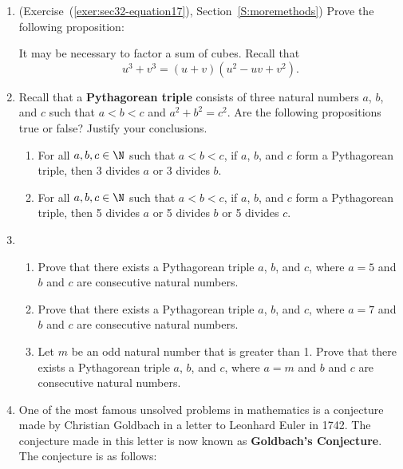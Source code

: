 \begin{enumerate}
\item (Exercise~(\ref{exer:sec32-equation17}), Section~\ref{S:moremethods})  Prove the following proposition:
\label{exer:sec32-equation}%
\hint It may be necessary to factor a sum  of cubes.  Recall that 
\[
u^3 + v^3 = \left( u + v \right) \left( u^2 - uv + v^2 \right).
\]



\item Recall that a \textbf{Pythagorean triple}
%
 consists of three natural numbers $a$, $b$, and $c$ such that 
$a < b < c$ and $a^2 + b^2 = c^2$.  Are the following propositions true or false?  Justify your conclusions.
\begin{enumerate}
\item For all $a, b, c \in \N$ such that $a < b < c$, if $a$, $b$, and $c$ form a Pythagorean triple, then 3 divides $a$ or 3 divides $b$.
\item For all $a, b, c \in \N$ such that $a < b < c$, if $a$, $b$, and $c$ form a Pythagorean triple, then 5 divides $a$ or 5 divides $b$ or 5 divides $c$.
\end{enumerate}

\item \begin{enumerate}
\item Prove that there exists a Pythagorean triple $a$, $b$, and $c$, where  $a = 5$ and $b$ and $c$ are consecutive natural numbers.

\item Prove that there exists a Pythagorean triple $a$, $b$, and $c$, where  $a = 7$ and $b$ and $c$ are consecutive natural numbers.

\item Let $m$ be an odd natural number that is greater than 1.  Prove that there exists a Pythagorean triple $a$, $b$, and $c$, where  $a = m$ and $b$ and $c$ are consecutive natural numbers.
\end{enumerate}

\item One of the most famous unsolved problems in mathematics is a conjecture made by Christian Goldbach in a letter to Leonhard Euler in 1742.  The conjecture made in this letter is now known as \textbf{Goldbach's Conjecture}. \label{exer:goldbach}
%
  The conjecture is as follows:


\end{enumerate}
